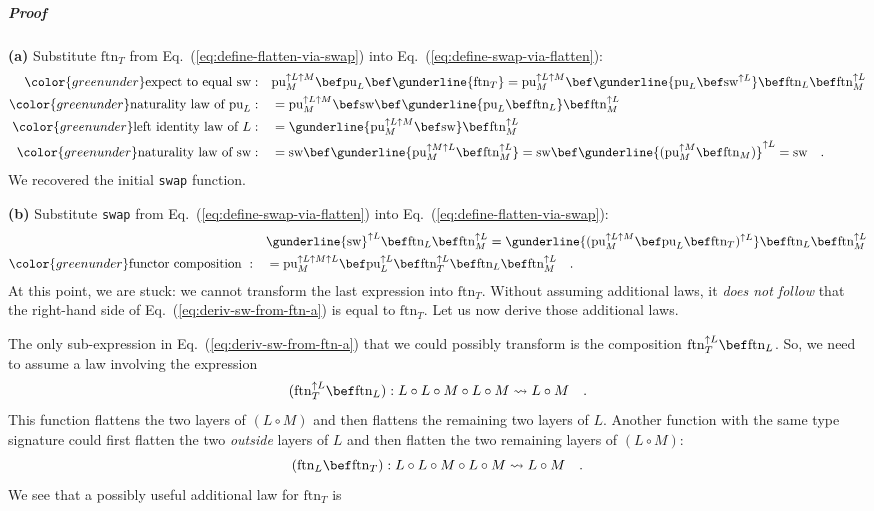 \subparagraph{Proof}

\textbf{(a)} Substitute $\text{ftn}_{T}$ from Eq.~(\ref{eq:define-flatten-via-swap})
into Eq.~(\ref{eq:define-swap-via-flatten}):
\begin{align*}
{\color{greenunder}\text{expect to equal }\text{sw}:}\quad & \text{pu}_{M}^{\uparrow L\uparrow M}\bef\text{pu}_{L}\bef\gunderline{\text{ftn}_{T}}=\text{pu}_{M}^{\uparrow L\uparrow M}\bef\gunderline{\text{pu}_{L}\bef\text{sw}^{\uparrow L}}\bef\text{ftn}_{L}\bef\text{ftn}_{M}^{\uparrow L}\\
{\color{greenunder}\text{naturality law of }\text{pu}_{L}:}\quad & =\text{pu}_{M}^{\uparrow L\uparrow M}\bef\text{sw}\bef\gunderline{\text{pu}_{L}\bef\text{ftn}_{L}}\bef\text{ftn}_{M}^{\uparrow L}\\
{\color{greenunder}\text{left identity law of }L:}\quad & =\gunderline{\text{pu}_{M}^{\uparrow L\uparrow M}\bef\text{sw}}\bef\text{ftn}_{M}^{\uparrow L}\\
{\color{greenunder}\text{naturality law of }\text{sw}:}\quad & =\text{sw}\bef\gunderline{\text{pu}_{M}^{\uparrow M\uparrow L}\bef\text{ftn}_{M}^{\uparrow L}}=\text{sw}\bef\gunderline{(\text{pu}_{M}^{\uparrow M}\bef\text{ftn}_{M})}^{\uparrow L}=\text{sw}\quad.
\end{align*}
We recovered the initial \lstinline!swap! function.

\textbf{(b)} Substitute \lstinline!swap! from Eq.~(\ref{eq:define-swap-via-flatten})
into Eq.~(\ref{eq:define-flatten-via-swap}):
\begin{align}
 & \gunderline{\text{sw}}^{\uparrow L}\bef\text{ftn}_{L}\bef\text{ftn}_{M}^{\uparrow L}=\gunderline{(\text{pu}_{M}^{\uparrow L\uparrow M}\bef\text{pu}_{L}\bef\text{ftn}_{T})^{\uparrow L}}\bef\text{ftn}_{L}\bef\text{ftn}_{M}^{\uparrow L}\nonumber \\
{\color{greenunder}\text{functor composition }:}\quad & =\text{pu}_{M}^{\uparrow L\uparrow M\uparrow L}\bef\text{pu}_{L}^{\uparrow L}\bef\text{ftn}_{T}^{\uparrow L}\bef\text{ftn}_{L}\bef\text{ftn}_{M}^{\uparrow L}\quad.\label{eq:deriv-sw-from-ftn-a}
\end{align}
At this point, we are stuck: we cannot transform the last expression
into $\text{ftn}_{T}$. Without assuming additional laws, it \emph{does
not follow} that the right-hand side of Eq.~(\ref{eq:deriv-sw-from-ftn-a})
is equal to $\text{ftn}_{T}$. Let us now derive those additional
laws. 

The only sub-expression in Eq.~(\ref{eq:deriv-sw-from-ftn-a}) that
we could possibly transform is the composition $\text{ftn}_{T}^{\uparrow L}\bef\text{ftn}_{L}$.
So, we need to assume a law involving the expression 
\[
(\text{ftn}_{T}^{\uparrow L}\bef\text{ftn}_{L}):L\circ L\circ M\circ L\circ M\leadsto L\circ M\quad.
\]
This function flattens the two layers of $\left(L\circ M\right)$
and then flattens the remaining two layers of $L$. Another function
with the same type signature could first flatten the two \emph{outside}
layers of $L$ and then flatten the two remaining layers of $\left(L\circ M\right)$:
\[
(\text{ftn}_{L}\bef\text{ftn}_{T}):L\circ L\circ M\circ L\circ M\leadsto L\circ M\quad.
\]
We see that a possibly useful additional law for $\text{ftn}_{T}$
is

